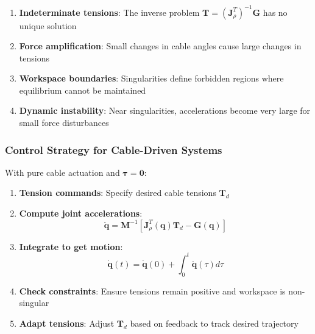 \begin{enumerate}
    \item \textbf{Indeterminate tensions}: The inverse problem $\mathbf{T} = (\mathbf{J}_{\rho}^T)^{-1} \mathbf{G}$ has no unique solution
    
    \item \textbf{Force amplification}: Small changes in cable angles cause large changes in tensions
    
    \item \textbf{Workspace boundaries}: Singularities define forbidden regions where equilibrium cannot be maintained
    
    \item \textbf{Dynamic instability}: Near singularities, accelerations become very large for small force disturbances
\end{enumerate}

\subsubsection{Control Strategy for Cable-Driven Systems}

With pure cable actuation and $\boldsymbol{\tau} = \mathbf{0}$:

\begin{enumerate}
    \item \textbf{Tension commands}: Specify desired cable tensions $\mathbf{T}_d$
    
    \item \textbf{Compute joint accelerations}:
    \begin{equation}
    \ddot{\mathbf{q}} = \mathbf{M}^{-1} \left[ \mathbf{J}_{\rho}^T(\mathbf{q}) \mathbf{T}_d - \mathbf{G}(\mathbf{q}) \right]
    \end{equation}
    
    \item \textbf{Integrate to get motion}:
    \begin{equation}
    \dot{\mathbf{q}}(t) = \dot{\mathbf{q}}(0) + \int_0^t \ddot{\mathbf{q}}(\tau) d\tau
    \end{equation}
    
    \item \textbf{Check constraints}: Ensure tensions remain positive and workspace is non-singular
    
    \item \textbf{Adapt tensions}: Adjust $\mathbf{T}_d$ based on feedback to track desired trajectory
\end{enumerate}

